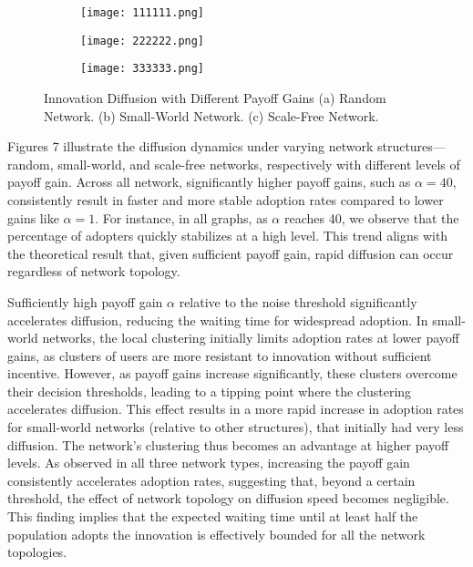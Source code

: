 \documentclass{article} %
\begin{document}
\begin{figure}[h]
    \centering
    \begin{subfigure}{0.32\textwidth}
        \centering
        \texttt{[image: 111111.png]} %
        \caption{}
        \label{fig:subfig1}
    \end{subfigure}
    \hfill
    \begin{subfigure}{0.32\textwidth}
        \centering
        \texttt{[image: 222222.png]} %
        \caption{}
        \label{fig:subfig2}
    \end{subfigure}
    \hfill
    \begin{subfigure}{0.32\textwidth}
        \centering
        \texttt{[image: 333333.png]} %
        \caption{}
        \label{fig:subfig3}
    \end{subfigure}
    \caption{Innovation Diffusion with Different Payoff Gains (a) Random Network. (b) Small-World Network. (c) Scale-Free Network.}
    \label{fig:adoption_trends}
\end{figure}

Figures 7 illustrate the diffusion dynamics under varying network structures—random, small-world, and scale-free networks, respectively with different levels of payoff gain. Across all network, significantly higher payoff gains, such as \(\alpha = 40 \), consistently result in faster and more stable adoption rates compared to lower gains like \( \alpha = 1 \). For instance, in all graphs, as \( \alpha \) reaches 40, we observe that the percentage of adopters quickly stabilizes at a high level. This trend aligns with the theoretical result that, given sufficient payoff gain, rapid diffusion can occur regardless of network topology. 

Sufficiently high payoff gain \( \alpha \) relative to the noise threshold significantly accelerates diffusion, reducing the waiting time for widespread adoption. In small-world networks, the local clustering initially limits adoption rates at lower payoff gains, as clusters of users are more resistant to innovation without sufficient incentive. However, as payoff gains increase significantly, these clusters overcome their decision thresholds, leading to a tipping point where the clustering accelerates diffusion. This effect results in a more rapid increase in adoption rates for small-world networks (relative to other structures), that initially had very less diffusion. The network's clustering thus becomes an advantage at higher payoff levels.  As observed in all three network types, increasing the payoff gain consistently accelerates adoption rates, suggesting that, beyond a certain threshold, the effect of network topology on diffusion speed becomes negligible. This finding implies that the expected waiting time until at least half the population adopts the innovation is effectively bounded for all the network topologies. 
\end{document}
